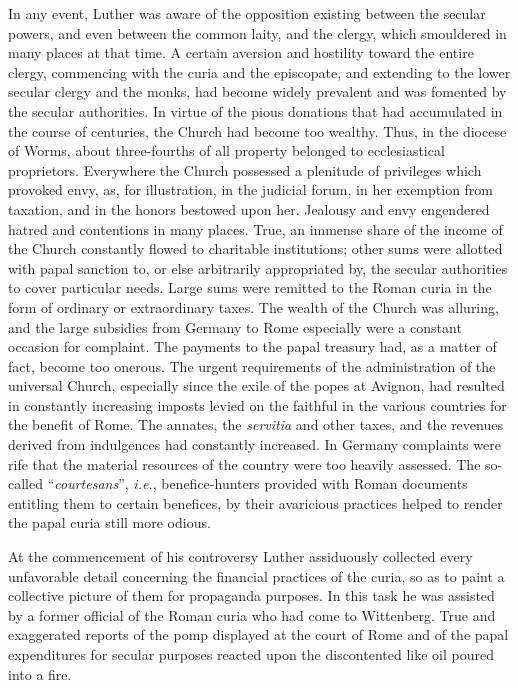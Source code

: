 In any event, Luther was aware of the opposition existing between the
secular powers, and even between the common laity, and the clergy, which
smouldered in many places at that time. A certain
aversion and hostility toward the entire clergy, commencing with
the curia and the episcopate, and extending to the lower secular
clergy and the monks, had become widely prevalent and was fomented by
the secular authorities. In virtue of the pious donations
that had accumulated in the course of centuries, the Church had
become too wealthy. Thus, in the diocese of Worms, about three-fourths
of all property belonged to ecclesiastical proprietors. Everywhere the
Church possessed a plenitude of privileges which provoked
envy, as, for illustration, in the judicial forum, in her exemption
from taxation, and in the honors bestowed upon her. Jealousy and
envy engendered hatred and contentions in many places. True, an
immense share of the income of the Church constantly flowed to
charitable institutions; other sums were allotted with papal
sanction to, or else arbitrarily appropriated by, the secular authorities to
cover particular needs. Large sums were remitted to the Roman
curia in the form of ordinary or extraordinary taxes. The wealth of
the Church was alluring, and the large subsidies from Germany to
Rome especially were a constant occasion for complaint. The payments to
the papal treasury had, as a matter of fact, become too
onerous. The urgent requirements of the administration of the universal
Church, especially since the exile of the popes at Avignon,
had resulted in constantly increasing imposts levied on the faithful in
the various countries for the benefit of Rome. The annates,
the \textit{servitia} and other taxes, and the revenues derived from indulgences
had constantly increased. In Germany complaints were rife that
the material resources of the country were too heavily assessed. The
so-called ``\textit{courtesans}'', \textit{i.e.}, benefice-hunters provided with Roman
documents entitling them to certain benefices, by their avaricious
practices helped to render the papal curia still more odious.

At the commencement of his controversy Luther assiduously collected
every unfavorable detail concerning the financial practices
of the curia, so as to paint a collective picture of them for propaganda
purposes. In this task he was assisted by a former official of the
Roman curia who had come to Wittenberg. True and exaggerated
reports of the pomp displayed at the court of Rome and of the papal
expenditures for secular purposes reacted upon the discontented
like oil poured into a fire.

